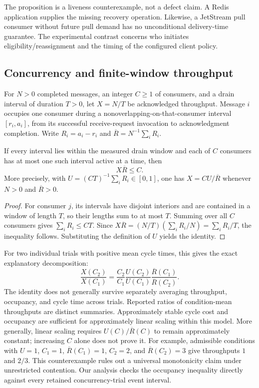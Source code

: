 The proposition is a liveness counterexample, not a defect claim. A Redis application supplies the missing recovery operation. Likewise, a JetStream pull consumer without future pull demand has no unconditional delivery-time guarantee. The experimental contrast concerns who initiates eligibility/reassignment and the timing of the configured client policy.

\subsection{Concurrency and finite-window throughput}

\begin{definition}
For $N>0$ completed messages, an integer $C\geq1$ of consumers, and a drain interval of duration $T>0$, let $X=N/T$ be acknowledged throughput. Message $i$ occupies one consumer during a nonoverlapping-on-that-consumer interval $[r_i,a_i]$, from its successful receive-request invocation to acknowledgment completion. Write $R_i=a_i-r_i$ and $\overline R=N^{-1}\sum_i R_i$.
\end{definition}

\begin{theorem}\label{thm:concurrency}
If every interval lies within the measured drain window and each of $C$ consumers has at most one such interval active at a time, then
\[
X\overline R\leq C.
\]
More precisely, with $U=(CT)^{-1}\sum_iR_i\in[0,1]$, one has $X=C U/\overline R$ whenever $N>0$ and $\overline R>0$.
\end{theorem}
\begin{proof}
For consumer $j$, its intervals have disjoint interiors and are contained in a window of length $T$, so their lengths sum to at most $T$. Summing over all $C$ consumers gives $\sum_iR_i\leq CT$. Since $X\overline R=(N/T)(\sum_iR_i/N)=\sum_iR_i/T$, the inequality follows. Substituting the definition of $U$ yields the identity.
\end{proof}

For two individual trials with positive mean cycle times, this gives the exact explanatory decomposition:
\[
\frac{X(C_2)}{X(C_1)}=
\frac{C_2}{C_1}\frac{U(C_2)}{U(C_1)}
\frac{\overline R(C_1)}{\overline R(C_2)}.
\]
The identity does not generally survive separately averaging throughput, occupancy, and cycle time across trials. Reported ratios of condition-mean throughputs are distinct summaries. Approximately stable cycle cost and occupancy are sufficient for approximately linear scaling within this model. More generally, linear scaling requires $U(C)/\overline R(C)$ to remain approximately constant; increasing $C$ alone does not prove it. For example, admissible conditions with $U=1$, $C_1=1$, $\overline R(C_1)=1$, $C_2=2$, and $\overline R(C_2)=3$ give throughputs $1$ and $2/3$. This counterexample rules out a universal monotonicity claim under unrestricted contention. Our analysis checks the occupancy inequality directly against every retained concurrency-trial event interval.

